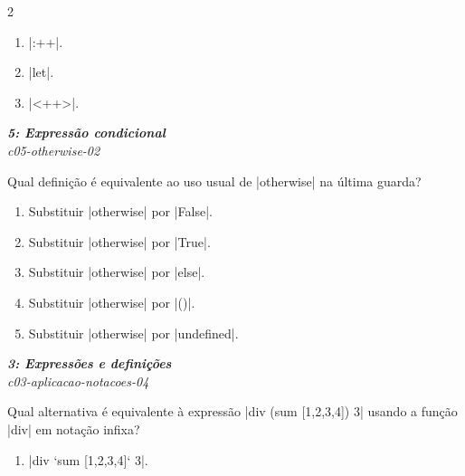 \documentclass[a4paper,10pt,brazil]{article}
\begin{document}
\begin{multicols}{2}
\begin{enumerate}
  \item \haskellinline|:++|.

  \item \haskellinline|let|.

  \item \haskellinline|<++>|.


\end{enumerate}

\begin{flushright}
  \footnotesize
  \textit{\textbf{5: Expressão condicional}}\\
  \textit{c05-otherwise-02}\\

\end{flushright}
Qual definição é equivalente ao uso usual de \haskellinline|otherwise| na última guarda?

\begin{enumerate}
  \item Substituir \haskellinline|otherwise| por \haskellinline|False|.

  \item Substituir \haskellinline|otherwise| por \haskellinline|True|.

  \item Substituir \haskellinline|otherwise| por \haskellinline|else|.

  \item Substituir \haskellinline|otherwise| por \haskellinline|()|.

  \item Substituir \haskellinline|otherwise| por \haskellinline|undefined|.


\end{enumerate}

\begin{flushright}
  \footnotesize
  \textit{\textbf{3: Expressões e definições}}\\
  \textit{c03-aplicacao-notacoes-04}\\

\end{flushright}
Qual alternativa é equivalente à expressão \haskellinline|div (sum [1,2,3,4]) 3| usando a função \haskellinline|div| em notação infixa?

\begin{enumerate}
  \item \haskellinline|div `sum [1,2,3,4]` 3|.


\end{enumerate}
\end{multicols}
\end{document}

